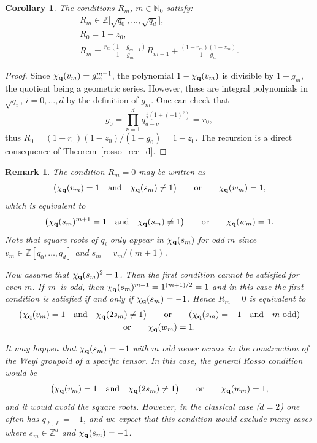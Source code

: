 \documentclass[10pt,a4paper]{amsart}
\numberwithin{equation}{section}
\newtheorem{Corollary}[Theorem]{Corollary}
\newtheorem{Remark}[Theorem]{Remark}
\newcommand{\NN }{\mathbb{N}}
\newcommand{\ZZ }{\mathbb{Z}}
\newcommand{\qq }{{\bf q}}
\newcommand{\dn }{d}
\newcommand{\bich }{\chi}
\begin{document}
\begin{Corollary} The conditions $R_m$, $m\in\NN_0$ satisfy:
\begin{gather*}%
R_m \in   \ZZ\big[\sqrt{q_0},\dots,\sqrt{q_d}\big],\nonumber\\
R_0 =  1-z_0, \nonumber\\
R_m =  \frac{r_m(1-g_{m-1})}{1-g_m} R_{m-1} + \frac{(1-r_m)(1-z_m)}{1-g_m}.
\end{gather*}
\end{Corollary}

\begin{proof}
Since $\chi_\qq(v_m)=g_m^{m+1}$, the polynomial $1-\chi_\qq(v_m)$ is divisible by $1-g_m$, the quotient being a geometric series. However, these are integral polynomials in $\sqrt{q_i}$, $i=0,\dots,d$ by the definition of $g_m$.
One can check that
\[g_0=\prod_{\nu=1}^d q_{\dn-\nu}^{\frac{1}{2}(1+(-1)^\nu)}=r_0,
\]
thus
$R_0 = (1-r_0)(1-z_0)/(1-g_0)=1-z_0$.
The recursion is a direct consequence of Theo\-rem~\ref{rosso_rec_d}.
\end{proof}

\begin{Remark}The condition $R_m=0$ may be written as
\begin{gather*}
\big(\bich_\qq(v_m)=1 \quad \text{and}\quad \bich_\qq(s_m)\ne 1\big)
\qquad \text{or} \qquad
\bich_\qq(w_m)=1,
\end{gather*}
which is equivalent to
\begin{gather*}
\big(\bich_\qq(s_m)^{m+1}=1 \quad \text{and}\quad \bich_\qq(s_m)\ne 1\big)
\qquad \text{or} \qquad
\bich_\qq(w_m)=1.
\end{gather*}
Note that square roots of $q_i$ only appear in $\bich_\qq(s_m)$ for odd $m$ since $v_m\in\ZZ[q_0,\dots,q_\dn]$ and $s_m=v_m/(m+1)$.

Now assume that $\bich_\qq(s_m)^2=1$. Then the first condition cannot be satisfied for even $m$.
If~$m$~is odd,
then $\bich_\qq(s_m)^{m+1}=1^{(m+1)/2}=1$ and in this case the first condition is satisfied if and only if $\bich_\qq(s_m)=-1$. Hence $R_m=0$ is equivalent to
\begin{gather*}
\big(\bich_\qq(v_m)=1 \quad\text{and} \quad\bich_\qq(2s_m)\ne 1\big)
\qquad \text{or} \qquad
(\bich_\qq(s_m)=-1 \quad \text{and}\quad m \text{ odd})\nonumber \\
\text{or} \qquad
\bich_\qq(w_m)=1.
\end{gather*}

It may happen that $\bich_\qq(s_m)=-1$ with $m$ odd never occurs in the construction of the Weyl groupoid of a specific tensor. In this case, the general Rosso condition would be
\begin{gather*}
\big(\bich_\qq(v_m)=1 \quad \text{and}\quad \bich_\qq(2s_m)\ne 1\big)
\qquad \text{or} \qquad
\bich_\qq(w_m)=1,
\end{gather*}
and it would avoid the square roots.
However, in the classical case ($d=2$) one often has $q_{\ell,\ell}=-1$, and we expect that this
condition would exclude many cases where $s_m\in\ZZ^d$ and $\bich_\qq(s_m)=-1$.
\end{Remark}
\end{document}
